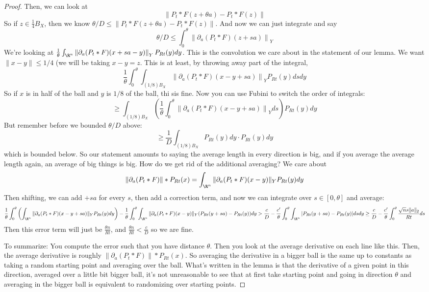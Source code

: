 \begin{proof}
Then, we can look at 
\[
\left\|P_t * F(z + \theta a) - P_t * F(z)\right\|
\]
So if $z \in \frac{1}{4}B_X$, then we know $\theta/D \leq \left\|P_t * F(z + \theta a) - P_t* F(z)\right\|$. And now we can just integrate and say 
\[
\theta/D \leq \int_{0}^{\theta} \left\|\partial_a(P_t*F)(z + sa)\right\|_Y 
\]
We're looking at $\frac{1}{\theta} \int_{\R^n} \left\| \partial_a(P_t * F)(x + sa - y)\right\|_Y P_{Rt}(y) dy$. This is the convolution we care about in the statement of our lemma. We want $\|x - y\| \leq 1/4$ (we will be taking $x - y = z$. This is at least, by throwing away part of the integral, 
\[
\frac{1}{\theta} \int_0^{\theta} \int_{(1/8)B_X} \left\|\partial_a(P_t * F)(x - y + sa)\right\|_Y P_{Rt}(y) ds dy
\]
So if $x$ is in half of the ball and $y$ is $1/8$ of the ball, thi sis fine. Now you can use Fubini to switch the order of integrals: 
\[
\geq \int_{(1/8)B_X} \left(\frac{1}{\theta}\int_0^{\theta} \left\|\partial_a(P_t * F)(x - y + sa)\right\|_Y ds \right) P_{Rt}(y) dy
\]
But remember before we bounded $\theta/ D$ above: 
\[
\geq \frac{1}{D} \int_{(1/8)B_X} P_{Rt}(y)dy \cdot P_{Rt}(y) dy
\]
which is bounded below. 
So our statement amounts to saying the average length in every direction is big, and if you average the average length again, an average of big things is big.
How do we get rid of the additional averaging? We care about 
\[
\|\partial_a(P_t * F)\| * P_{Rt}(x) = \int_{\R^n} \|\partial_a(P_t *F)(x - y)\|_Y P_{Rt}(y) dy
\] 
Then shifting, we can add $ + sa$ for every $s$, then add a correction term, and now we can integrate over $s \in [0, \theta]$ and average: 
\[
\frac{1}{\theta} \int_0^{\theta} \left(\int_{\R^n} \|\partial_a(P_t *F)(x - y + sa)\|_Y P_{Rt}(y) dy \right) - \frac{1}{\theta} \int_0^{\theta} \int_{\R^n} \|\partial_a(P_t *F)(x - y)\|_Y (P_{Rt}(y + sa) - P_{Rt}(y)) dy > \frac{c}{D} - \frac{c'}{\theta} \int_0^{\theta} \int_{\R^n} | P_{Rt}(y + sa) - P_{Rt}(y)| ds dy \geq \frac{c}{D} - \frac{c'}{\theta} \int_0^{\theta} \frac{\sqrt{n}s\|a\|_2}{Rt} ds
\]
Then this error term will just be $\frac{\theta n}{Rt}$, and $\frac{\theta n}{Rt} < \frac{c}{D}$ so we are fine. 

To summarize: You compute the error such that you have distance $\theta$. Then you look at the average derivative on each line like this. Then, the average derivative is roughly $\|\partial_a(P_t * F)\| * P_{Rt}(x)$. So averaging the derivative in a bigger ball is the same up to constants as taking a random starting point and averaging over the ball. What's written in the lemma is that the derivative of a given point in this direction, averaged over a little bit bigger ball, it's not unreasonable to see that at first take starting point and going in direction $\theta$ and averaging in the bigger ball is equivalent to randomizing over starting points. 
\end{proof}

